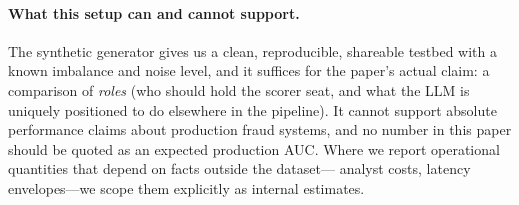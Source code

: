 \paragraph{What this setup can and cannot support.}
The synthetic generator gives us a clean, reproducible, shareable testbed with
a known imbalance and noise level, and it suffices for the paper's actual
claim: a comparison of \emph{roles} (who should hold the scorer seat, and what
the LLM is uniquely positioned to do elsewhere in the pipeline). It cannot
support absolute performance claims about production fraud systems, and no
number in this paper should be quoted as an expected production AUC. Where we
report operational quantities that depend on facts outside the dataset---
analyst costs, latency envelopes---we scope them explicitly as internal
estimates.
